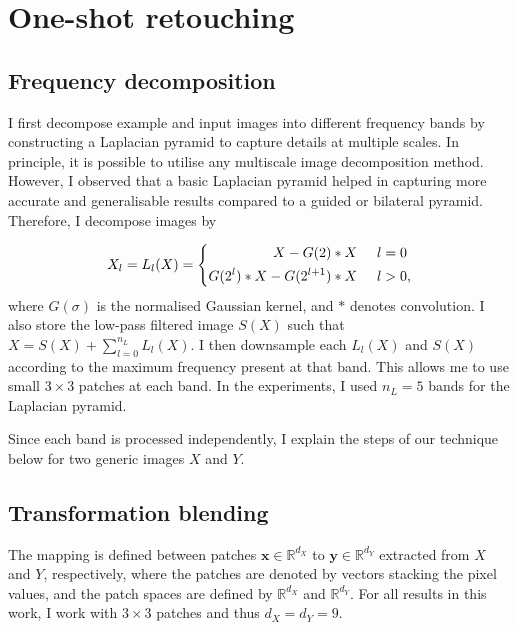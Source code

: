 
\section{One-shot retouching}
\label{sec:Methodology}

\subsection{Frequency decomposition}\label{sec:thePatchMap}

I first decompose example and input images into different frequency bands by constructing a Laplacian pyramid to capture details at multiple scales. In principle, it is possible to utilise any multiscale image decomposition method. However, I observed that a basic Laplacian pyramid helped in capturing more accurate and generalisable results compared to a guided or bilateral pyramid. Therefore, I decompose images by

\begin{equation} 
	X_l = L_l(X) = 
 \left \{ \begin{aligned}
        X - G(2) \ast X \hspace{5mm} &l=0\\
        G(2^l) \ast X - G(2^{l+1}) \ast X \hspace{5mm} &l>0,
       \end{aligned}
 \right.
\end{equation}
where $G(\sigma)$ is the normalised Gaussian kernel, and $\ast$ denotes convolution. I also store the low-pass filtered image $S(X)$ such that $X = S(X) + \sum_{l=0}^{n_L} L_l(X)$. I then downsample each $L_l(X)$ and $S(X)$ according to the maximum frequency present at that band. This allows me to use small $3 \times 3$ patches at each band. In the experiments, I used $n_L = 5$ bands for the Laplacian pyramid.


Since each band is processed independently, I explain the steps of our technique below for two generic images $X$ and $Y$.


\subsection{Transformation blending}\label{sec:Blending}

The mapping is defined between patches $\mathbf{x} \in \mathbb{R}^{d_X}$ to $\mathbf{y} \in \mathbb{R}^{d_Y}$ extracted from $X$ and $Y$, respectively, where the patches are denoted by vectors stacking the pixel values, and the patch spaces are defined by $\mathbb{R}^{d_X}$ and  $\mathbb{R}^{d_Y}$. For all results in this work, I work with $3 \times 3$ patches and thus $d_X = d_Y = 9$.

